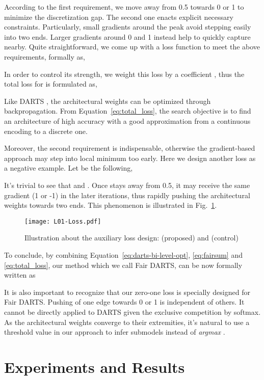 \documentclass[runningheads]{llncs}
\begin{document}
According to the first requirement, we move  away from 0.5 towards 0 or 1 to minimize the discretization gap. The second one enacts explicit necessary constraints. Particularly, small gradients around the peak avoid stepping easily into two ends. Larger gradients around 0 and 1 instead help to quickly capture  nearby. Quite straightforward, we come up with a loss function to meet the above requirements, formally as,

In order to control its strength, we weight this loss by a coefficient , thus the total loss for  is formulated as, 


Like DARTS \cite{liu2018darts}, the architectural weights can be optimized through backpropagation. From Equation~\ref{eq:total_loss}, the search objective is to find an architecture of high accuracy  with a good approximation from a continuous encoding to a discrete one.

Moreover, the second requirement is indispensable, otherwise the gradient-based approach may step into local minimum too early. Here we design another loss as a negative example. Let  be the following,



It's trivial to see that  and . Once  stays away from 0.5, it may receive the same gradient (1 or -1) in the later iterations, thus rapidly pushing the architectural weights towards two ends. This phenomenon is illustrated in Fig.~\ref{fig:01los}.

\begin{figure}[ht]
	\centering
	\texttt{[image: L01-Loss.pdf]}
\caption{Illustration about the auxiliary loss design:   (proposed) and  (control)}
	\label{fig:01los}
\end{figure}

To conclude, by combining Equation~\ref{eq:darts-bi-level-opt}, \ref{eq:fairsum} and \ref{eq:total_loss}, our method which we call Fair DARTS, can be now formally written as


It is also important to recognize that our zero-one loss is specially designed for Fair DARTS. Pushing  of one edge towards 0 or 1 is independent of others. It cannot be directly applied to DARTS given the exclusive competition by softmax.  
As the architectural weights converge to their extremities, it's natural to use a threshold value  in our approach to infer submodels instead of \emph{argmax} . 


\section{Experiments and Results}
\end{document}
